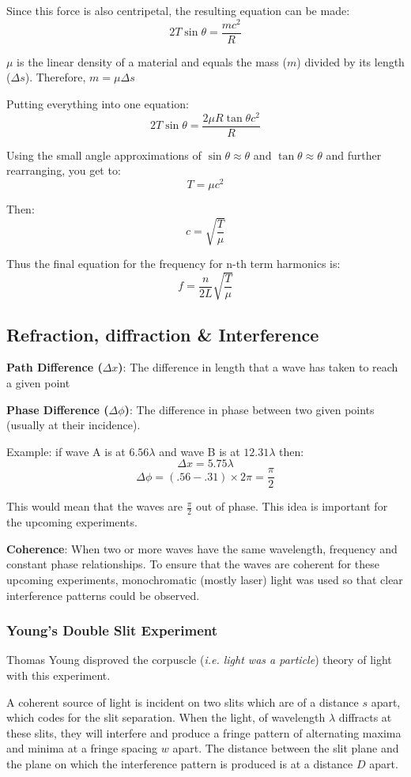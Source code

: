 \documentclass{article}
\begin{document}
Since this force is also centripetal, the resulting equation can be made:
$$2T\sin{\theta} = \frac{mc^2}{R}$$

$\mu$ is the linear density of a material and equals the mass ($m$) divided by its length ($\Delta s$). Therefore, $m = \mu\Delta s$

Putting everything into one equation:
$$2T\sin{\theta} = \frac{2\mu R \tan{\theta} c^2}{R}$$

Using the small angle approximations of $\sin{\theta} \approx \theta$ and $\tan{\theta} \approx \theta$ and further rearranging, you get to:
$$T = \mu c^2$$

Then:
$$c = \sqrt{\frac{T}{\mu}}$$

Thus the final equation for the frequency for n-th term harmonics is:
$$f = \frac{n}{2L}\sqrt{\frac{T}{\mu}}$$

\subsection{Refraction, diffraction \& Interference}
\textbf{Path Difference ($\Delta x$)}: The difference in length that a wave has taken to reach a given point 

\textbf{Phase Difference ($\Delta\phi$)}: The difference in phase between two given points (usually at their incidence).

Example: if wave A is at $6.56\lambda$ and wave B is at $12.31\lambda$ then:
$$\Delta x = 5.75\lambda$$
$$\Delta\phi = (.56 - .31) \times 2\pi = \frac{\pi}{2}$$

This would mean that the waves are $\frac{\pi}{2}$ out of phase. This idea is important for the upcoming experiments.

\textbf{Coherence}: When two or more waves have the same wavelength, frequency and constant phase relationships. To ensure that the waves are coherent for these upcoming experiments, monochromatic (mostly laser) light was used so that clear interference patterns could be observed. 

\subsubsection{Young's Double Slit Experiment}
Thomas Young disproved the corpuscle (\textit{i.e. light was a particle}) theory of light with this experiment.

A coherent source of light is incident on two slits which are of a distance $s$ apart, which codes for the slit separation. When the light, of wavelength $\lambda$ diffracts at these slits, they will interfere and produce a fringe pattern of alternating maxima and minima at a fringe spacing $w$ apart. The distance between the slit plane and the plane on which the interference pattern is produced is at a distance $D$ apart. 
\end{document}
